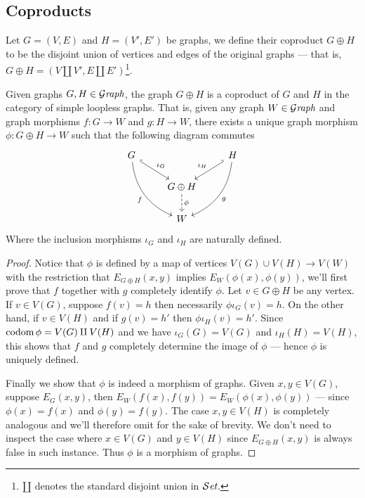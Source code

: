 \subsection{Coproducts}

\begin{definition}[Coproduct]\label{def: coprod-graph}
  Let \(G = (V, E)\) and \(H = (V', E')\) be graphs, we define their coproduct
  \(G \oplus H\) to be the disjoint union of vertices and edges of the original
  graphs --- that is, \(G \oplus H = (V \amalg V', E \amalg
  E')\)\footnote{\(\amalg\) denotes the standard disjoint union in \({\mathcal{S}\textit{et}}\).}.
\end{definition}

\begin{proposition}
  \label{prop: coprod-graph}
  Given graphs \(G, H \in {\mathcal{G}\textit{raph}}\), the graph \(G \oplus H\) is a coproduct of
  \(G\) and \(H\) in the category of simple loopless graphs. That is, given any
  graph \(W \in {\mathcal{G}\textit{raph}}\) and graph morphisms \(f: G \to W\) and \(g: H \to W\),
  there exists a unique graph morphism \(\phi: G \oplus H \to W\) such that the
  following diagram commutes
  \[
    \begin{tikzcd}
      G \ar[dr, hook, "\iota_G"] \ar[ddr, swap, bend right, "f"]
      & &H \ar[dl, swap, hook', "\iota_{H}"] \ar[ddl, bend left, "g"]
      \\
      &G \oplus H \ar[d, dashed, "\phi"]
      \\
      &W &
    \end{tikzcd}
  \]
  Where the inclusion morphisms \(\iota_G\) and \(\iota_{H}\) are naturally
  defined.
\end{proposition}

\begin{proof}
  Notice that \(\phi\) is defined by a map of vertices \(V(G) \cup V(H) \to
  V(W)\) with the restriction that \(E_{G \oplus H}(x, y)\) implies
  \(E_W(\phi(x), \phi(y))\), we'll first prove that \(f\) together with \(g\)
  completely identify \(\phi\). Let \(v \in G \oplus H\) be any vertex. If \(v
  \in V(G)\), suppose \(f(v) = h\) then necessarily \(\phi \iota_G(v) = h\). On
  the other hand, if \(v \in V(H)\) and if \(g(v) = h'\) then \(\phi
  \iota_{H}(v) = h'\). Since \(\operatorname{codom} \phi = V(G) \amalg V(H)\) and we have
  \(\iota_G(G) = V(G)\) and \(\iota_{H}(H) = V(H)\), this shows that \(f\) and
  \(g\) completely determine the image of \(\phi\) --- hence \(\phi\) is
  uniquely defined.

  Finally we show that \(\phi\) is indeed a morphism of graphs. Given \(x, y \in
  V(G)\), suppose \(E_G(x, y)\), then \(E_W(f(x), f(y)) = E_W(\phi(x),
  \phi(y))\) --- since \(\phi(x) = f(x)\) and \(\phi(y) = f(y)\). The case \(x,
  y \in V(H)\) is completely analogous and we'll therefore omit for the sake of
  brevity. We don't need to inspect the case where \(x \in V(G)\) and \(y \in
  V(H)\) since \(E_{G \oplus H}(x, y)\) is always false in such instance. Thus
  \(\phi\) is a morphism of graphs.
\end{proof}


